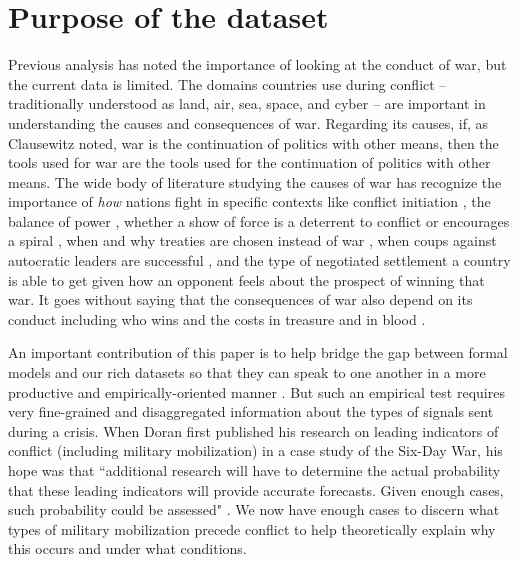 \documentclass[12pt,letterpaper]{article}
\begin{document}
\section{Purpose of the dataset}
 Previous analysis has noted the importance of looking at the conduct of war, but the current data is limited. The domains countries use during conflict -- traditionally understood as land, air, sea, space, and cyber -- are important in understanding the causes and consequences of war. Regarding its causes, if, as Clausewitz noted, war is the continuation of politics with other means, then the tools used for war are the tools used for the continuation of politics with other means. The wide body of literature studying the causes of war has recognize the importance of \textit{how} nations fight in specific contexts like conflict initiation \citep{beckley_emergingmilitarybalance_2017}, the balance of power \citep{horowitz_diffusionmilitarypower_2010}, whether a show of force is a deterrent to conflict or encourages a spiral \citep{glaser_politicalconsequencesmilitary_1992}, when and why treaties are chosen instead of war \citep{allison_armamentsarmscontrol_1975}, when coups against autocratic leaders are successful \citep{talmadge_differentthreatsdifferent_2016}, and the type of negotiated settlement a country is able to get given how an opponent feels about the prospect of winning that war. It goes without saying that the consequences of war also depend on its conduct including who wins \citep{rosen_winningnextwar_1994,lyall_ragemachinesexplaining_2009} and the costs in treasure and in blood \citep{caverley_2014}.

An important contribution of this paper is to help bridge the gap between formal models and our rich datasets so that they can speak to one another in a more productive and empirically-oriented manner \citep{fearon_signaling_1994}. But such an empirical test requires very fine-grained and disaggregated information about the types of signals sent during a crisis. When Doran first published his research on leading indicators of conflict (including military mobilization) in a case study of the Six-Day War, his hope was that ``additional research will have to determine the actual probability that these leading indicators will provide accurate forecasts. Given enough cases, such probability could be assessed" \citep{doran_leading_1980}. We now have enough cases to discern what types of military mobilization precede conflict to help theoretically explain why this occurs and under what conditions.
\end{document}
